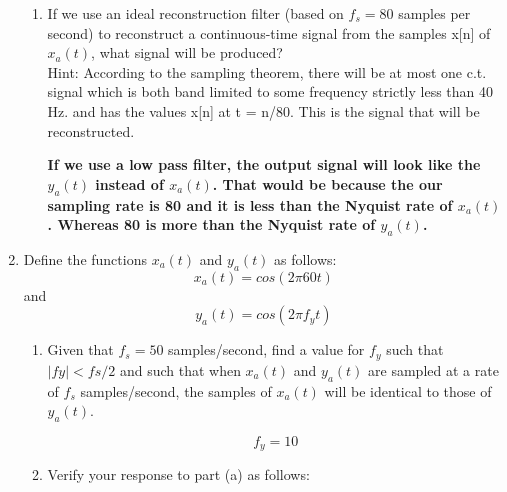 \documentclass[12pt]{article}
\begin{document}
\begin{enumerate}
\begin{enumerate}
\item If we use an ideal reconstruction filter (based on $f_s=80$ samples per second) to reconstruct a continuous-time signal from the samples x[n] of $x_a(t)$, what signal will be produced? \\
Hint: According to the sampling theorem, there will be at most one c.t. signal which is both band limited to some frequency strictly less than 40 Hz. and has the values
x[n] at t = n/80. This is the signal that will be reconstructed.

\textbf{If we use a low pass filter, the output signal will look like the $y_a(t)$ instead of $x_a(t)$. That would be because the our sampling rate is 80 and it is less than the Nyquist rate of $x_a(t)$. Whereas 80 is more than the Nyquist rate of $y_a(t)$.}

\end{enumerate}






\item Define the functions $x_a(t)$ and $y_a(t)$ as follows:
$$x_a(t) = cos(2\pi 60 t)$$ 
and 
$$y_a(t) =  cos(2\pi f_y t)$$
\begin{enumerate}









\item Given that $f_s = 50$ samples/second, find a value for $f_y$ such that $|fy|< fs/2$ and such that when $x_a(t)$ and $y_a(t)$ are sampled at a rate of $f_s$ samples/second, the samples of $x_a(t)$ will be identical to those of $y_a(t)$.



$$\boxed{f_y = 10}$$










\item Verify your response to part (a) as follows:
\begin{enumerate}


\end{enumerate}
\end{enumerate}
\end{enumerate}
\end{document}
